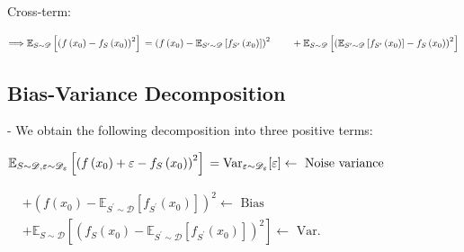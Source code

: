 Cross-term:


$
\Longrightarrow
\mathbb{E}_{S \sim \mathscr{D}}\left[\left(f\left(x_{0}\right)-f_{S}\left(x_{0}\right)\right)^{2}\right]
\\=\left(f\left(x_{0}\right)-\mathbb{E}_{S^{\prime} \sim \mathscr{D}}\left[f_{S^{\prime}}\left(x_{0}\right)\right]\right)^{2}
\\ \qquad + \mathbb{E}_{S \sim \mathscr{D}}\left[\left(\mathbb{E}_{S^{\prime} \sim \mathscr{D}}\left[f_{S^{\prime}}\left(x_{0}\right)\right]-f_{S}\left(x_{0}\right)\right)^{2}\right]
$

\subsection*{Bias-Variance Decomposition}
- We obtain the following decomposition into three positive terms:

$\mathbb{E}_{S \sim \mathscr{D}, \varepsilon \sim \mathscr{D}_{\varepsilon}}\left[\left(f\left(x_{0}\right)+\varepsilon-f_{S}\left(x_{0}\right)\right)^{2}\right]
\\=\operatorname{Var}_{\varepsilon \sim \mathscr{D}_{\varepsilon}}[\varepsilon] \leftarrow \text { Noise variance }$ 

$
\begin{aligned}
&+\left(f\left(x_{0}\right)-\mathbb{E}_{S^{\prime} \sim \mathscr{D}}\left[f_{S^{\prime}}\left(x_{0}\right)\right]\right)^{2} \leftarrow \text { Bias } 
\\
& +\mathbb{E}_{S \sim \mathscr{D}}\left[\left(f_{S}\left(x_{0}\right)-\mathbb{E}_{S^{\prime} \sim \mathscr{D}}\left[f_{S^{\prime}}\left(x_{0}\right)\right]\right)^{2}\right] \leftarrow \text { Var. } 
\end{aligned}
$

